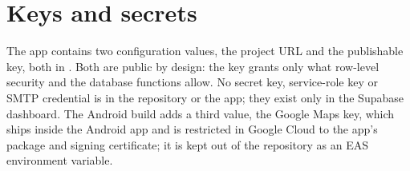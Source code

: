 \section{Keys and secrets}

The app contains two configuration values, the project URL and the publishable key, both in
. Both are public by design: the key grants only what row-level security and
the database functions allow. No secret key, service-role key or SMTP credential is in the repository or
the app; they exist only in the Supabase dashboard. The Android build adds a third value, the Google Maps
key, which ships inside the Android app and is restricted in Google Cloud to the app's package and signing
certificate; it is kept out of the repository as an EAS environment variable.
